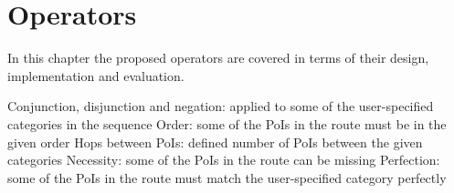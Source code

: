 \chapter{Operators} 
\label{sec:operators}

In this chapter the proposed operators are covered in terms of their design, implementation and evaluation.\newline

Conjunction, disjunction and negation: applied to some of the user-specified categories in the sequence\newline
Order: some of the PoIs in the route must be in the given order\newline
Hops between PoIs: defined number of PoIs between the given categories\newline
Necessity: some of the PoIs in the route can be missing\newline
Perfection:  some of the PoIs in the route must match the user-specified category perfectly\newline

